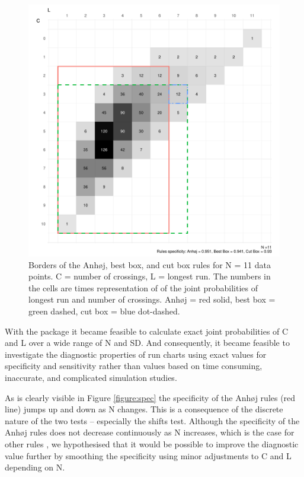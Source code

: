 \begin{figure}[htbp]
  \centering
  \includegraphics[width=\textwidth]{fig_box11.pdf}
  \caption{Borders of the Anhøj, best box, and cut box rules for N = 11 data points. 
           C = number of crossings, L = longest run.
           The numbers in the cells are times representation of of the joint
           probabilities of longest run and number of crossings.
           Anhøj = red solid, best box = green dashed, cut box = blue dot-dashed.}
  \label{figure:box11}
\end{figure}

With the  package it became feasible to calculate
exact joint probabilities of C and L over a wide range of N and SD. And
consequently, it became feasible to investigate the diagnostic
properties of run charts using exact values for specificity and
sensitivity rather than values based on time consuming, inaccurate, and
complicated simulation studies.

As is clearly visible in Figure \ref{figure:spec} the specificity of the
Anhøj rules (red line) jumps up and down as N changes. This is a
consequence of the discrete nature of the two tests -- especially the
shifts test. Although the specificity of the Anhøj rules does not
decrease continuously as N increases, which is the case for other rules
\citep{anhoej2014}, we hypothesised that it would be possible to improve
the diagnostic value further by smoothing the specificity using minor
adjustments to C and L depending on N.

